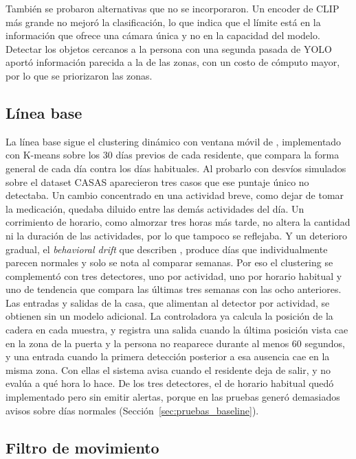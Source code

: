 También se probaron alternativas que no se incorporaron.
Un encoder de CLIP más grande no mejoró la clasificación, lo que indica que el límite está en la información que ofrece una cámara única y no en la capacidad del modelo.
Detectar los objetos cercanos a la persona con una segunda pasada de YOLO aportó información parecida a la de las zonas, con un costo de cómputo mayor, por lo que se priorizaron las zonas.

\subsection{Línea base}

La línea base sigue el clustering dinámico con ventana móvil de \textcite{Snoun2024}, implementado con K-means sobre los 30 días previos de cada residente, que compara la forma general de cada día contra los días habituales.
Al probarlo con desvíos simulados sobre el dataset CASAS aparecieron tres casos que ese puntaje único no detectaba.
Un cambio concentrado en una actividad breve, como dejar de tomar la medicación, quedaba diluido entre las demás actividades del día.
Un corrimiento de horario, como almorzar tres horas más tarde, no altera la cantidad ni la duración de las actividades, por lo que tampoco se reflejaba.
Y un deterioro gradual, el \textit{behavioral drift} que describen \textcite{Snoun2024}, produce días que individualmente parecen normales y solo se nota al comparar semanas.
Por eso el clustering se complementó con tres detectores, uno por actividad, uno por horario habitual y uno de tendencia que compara las últimas tres semanas con las ocho anteriores.
Las entradas y salidas de la casa, que alimentan al detector por actividad, se obtienen sin un modelo adicional.
La controladora ya calcula la posición de la cadera en cada muestra, y registra una salida cuando la última posición vista cae en la zona de la puerta y la persona no reaparece durante al menos 60 segundos, y una entrada cuando la primera detección posterior a esa ausencia cae en la misma zona.
Con ellas el sistema avisa cuando el residente deja de salir, y no evalúa a qué hora lo hace.
De los tres detectores, el de horario habitual quedó implementado pero sin emitir alertas, porque en las pruebas generó demasiados avisos sobre días normales (Sección~\ref{sec:pruebas_baseline}).

\subsection{Filtro de movimiento}

